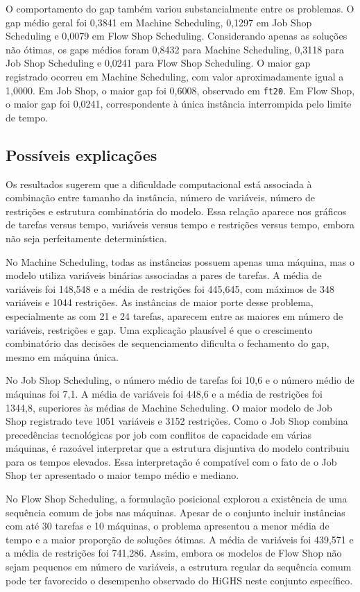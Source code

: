 O comportamento do gap também variou substancialmente entre os problemas. O gap
médio geral foi 0,3841 em Machine Scheduling, 0,1297 em Job Shop Scheduling e
0,0079 em Flow Shop Scheduling. Considerando apenas as soluções não ótimas, os
gaps médios foram 0,8432 para Machine Scheduling, 0,3118 para Job Shop
Scheduling e 0,0241 para Flow Shop Scheduling. O maior gap registrado ocorreu em
Machine Scheduling, com valor aproximadamente igual a 1,0000. Em Job Shop, o
maior gap foi 0,6008, observado em \texttt{ft20}. Em Flow Shop, o maior gap foi
0,0241, correspondente à única instância interrompida pelo limite de tempo.

\subsection{Possíveis explicações}

Os resultados sugerem que a dificuldade computacional está associada à
combinação entre tamanho da instância, número de variáveis, número de restrições
e estrutura combinatória do modelo. Essa relação aparece nos gráficos de
tarefas versus tempo, variáveis versus tempo e restrições versus tempo, embora
não seja perfeitamente determinística.

No Machine Scheduling, todas as instâncias possuem apenas uma máquina, mas o
modelo utiliza variáveis binárias associadas a pares de tarefas. A média de
variáveis foi 148,548 e a média de restrições foi 445,645, com máximos de 348
variáveis e 1044 restrições. As instâncias de maior porte desse problema,
especialmente as com 21 e 24 tarefas, aparecem entre as maiores em número de
variáveis, restrições e gap. Uma explicação plausível é que o crescimento
combinatório das decisões de sequenciamento dificulta o fechamento do gap, mesmo
em máquina única.

No Job Shop Scheduling, o número médio de tarefas foi 10,6 e o número médio de
máquinas foi 7,1. A média de variáveis foi 448,6 e a média de restrições foi
1344,8, superiores às médias de Machine Scheduling. O maior modelo de Job Shop
registrado teve 1051 variáveis e 3152 restrições. Como o Job Shop combina
precedências tecnológicas por job com conflitos de capacidade em várias
máquinas, é razoável interpretar que a estrutura disjuntiva do modelo contribuiu
para os tempos elevados. Essa interpretação é compatível com o fato de o Job
Shop ter apresentado o maior tempo médio e mediano.

No Flow Shop Scheduling, a formulação posicional explorou a existência de uma
sequência comum de jobs nas máquinas. Apesar de o conjunto incluir instâncias
com até 30 tarefas e 10 máquinas, o problema apresentou a menor média de tempo e
a maior proporção de soluções ótimas. A média de variáveis foi 439,571 e a média
de restrições foi 741,286. Assim, embora os modelos de Flow Shop não sejam
pequenos em número de variáveis, a estrutura regular da sequência comum pode ter
favorecido o desempenho observado do HiGHS neste conjunto específico.


